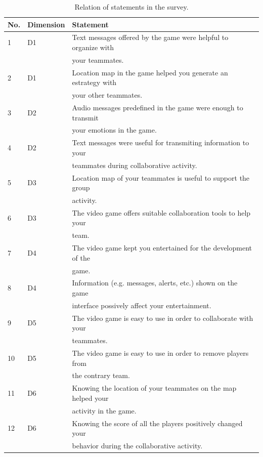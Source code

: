 \documentclass{./sty/llncs}
\newcommand{\head}[1]{\textnormal{\textbf{#1}}}
\begin{document}
\begin{table}[htbp]
\renewcommand{\arraystretch}{1.2}
	\centering
		\begin{tabular}{|l|l|l|}
			\hline
		 	\head{No.} & \head{Dimension}	& \head{Statement} \\
			\hline
			1&D1&Text messages offered by the game were helpful to organize with\\
			& & your teammates. \\ \hline 
			2&D1&Location map in the game helped you generate an estrategy with \\
			&&your other teammates. \\  \hline
			3&D2&Audio messages predefined in the game were enough to transmit \\ 
			&&your emotions in the game. \\  \hline
			4&D2&Text messages were useful for transmiting information to your \\
			&&teammates during collaborative activity. \\  \hline
			5&D3&Location map of your teammates is useful to support the group \\
			&& activity. \\ \hline
			6&D3&The video game offers suitable collaboration tools to help your \\
			&&team. \\ \hline 
			7&D4&The video game kept you entertained for the development of the \\
			&&game. \\\hline 
			8&D4&Information (e.g. messages, alerts, etc.) shown on the game  \\
			&&interface possively affect your entertainment. \\ \hline 
			9&D5&The video game is easy to use in order to collaborate with your \\
			&&teammates. \\ \hline
			10&D5&The video game is easy to use in order to remove players from \\ 
			&&the contrary team. \\  \hline
			11&D6&Knowing the location of your teammates on the map helped your \\
			&&activity in the game. \\ \hline 
			12&D6&Knowing the score of all the players positively changed your \\
			&&behavior during the collaborative activity. \\ \hline
		\end{tabular}
	\caption{Relation of statements in the survey.}
	\label{tab:RelationOfStatementsInTheSurvey}
\end{table}
\end{document}
